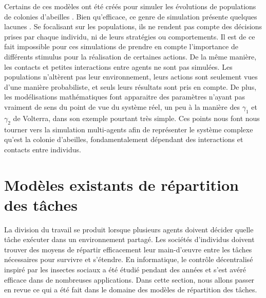 		Certains de ces modèles ont été créés pour simuler les évolutions de populations de colonies d'abeilles \cite{schmickl_hopomo_2007}. Bien qu'efficace, ce genre de simulation présente quelques lacunes \cite{drogoul_multi-agent_1992}. Se focalisant sur les populations, ils ne rendent pas compte des décisions prises par chaque individu, ni de leurs stratégies ou comportements. Il est de ce fait impossible pour ces simulations de prendre en compte l'importance de différents stimulus pour la réalisation de certaines actions. De la même manière, les contacts et petites interactions entre agents ne sont pas simulées. Les populations n'altèrent pas leur environnement, leurs actions sont seulement vues d'une manière probabiliste, et seuls leurs résultats sont pris en compte. De plus, les modélisations mathématiques font apparaitre des paramètres n'ayant pas vraiment de sens du point de vue du système réel, un peu à la manière des $\gamma_1$ et $\gamma_2$ de Volterra, dans son exemple pourtant très simple. Ces points nous font nous tourner vers la simulation multi-agents afin de représenter le système complexe qu'est la colonie d'abeilles, fondamentalement dépendant des interactions et contacts entre individus.
			
			
	\section{Modèles existants de répartition des tâches}
	La division du travail se produit lorsque plusieurs agents doivent décider quelle tâche exécuter dans un environnement partagé. Les sociétés d'individus doivent trouver des moyens de répartir efficacement leur main-d'œuvre entre les tâches nécessaires pour survivre et s'étendre. En informatique, le contrôle décentralisé inspiré par les insectes sociaux a été étudié pendant des années et s'est avéré efficace dans de nombreuses applications. Dans cette section, nous allons passer en revue ce qui a été fait dans le domaine des modèles de répartition des tâches.
	
	
